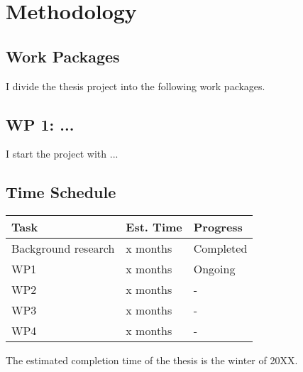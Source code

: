 \section{Methodology}

\lipsum[8-8]

\subsection{Work Packages}

I divide the thesis project into the following work packages.

\subsection*{WP 1: ...}

I start the project with ...

\subsection{Time Schedule}

\lipsum[9-9]

\begin{table}[h!]
\centering
\begin{tabular}{ l l l }
  \hline
  Task & Est. Time & Progress \\ \hline
  Background research & x months & Completed \\
  WP1 & x months & Ongoing \\
  WP2 & x months & - \\
  WP3 & x months & - \\
  WP4 & x months & - \\ \hline
\end{tabular}
\end{table}

The estimated completion time of the thesis is the winter of 20XX.